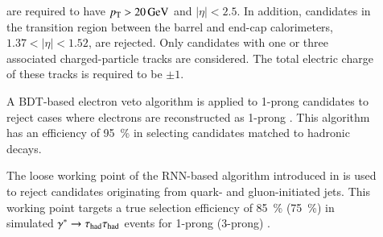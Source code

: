 \begin{description}



\item[\tauhadvis] are required to have $\pT > \SI{20}{\GeV}$ and $|\eta| <
  2.5$. In addition, \tauhadvis candidates in the transition region between the
  barrel and end-cap calorimeters, $1.37 < |\eta| < 1.52$, are rejected. Only
  \tauhadvis candidates with one or three associated charged-particle tracks are
  considered. The total electric charge of these tracks is required to be
  $\pm 1$.

  A BDT-based electron veto algorithm is applied to 1-prong \tauhadvis
  candidates to reject cases where electrons are reconstructed as 1-prong
  \tauhadvis. This algorithm has an efficiency of \SI{95}{\percent} in selecting
  \tauhadvis candidates matched to hadronic \taulepton decays.

  The loose working point of the RNN-based \tauid algorithm introduced in
   is used to reject \tauhadvis candidates originating from
  quark- and gluon-initiated jets. This working point targets a true \tauhadvis
  selection efficiency of \SI{85}{\percent} (\SI{75}{\percent}) in simulated
  $\gamma^* \to \tau_{\text{had}}\tau_{\text{had}}$ events for 1-prong (3-prong) \tauhadvis.



\end{description}
